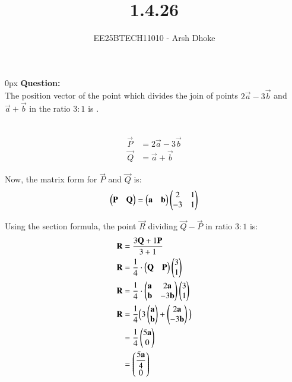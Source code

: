 \documentclass[journal]{IEEEtran}
\begin{document}

\vspace{3cm}

\title{1.4.26}
\author{EE25BTECH11010 - Arsh Dhoke}
{\let\newpage\relax\maketitle}

\renewcommand{\thefigure}{\theenumi}
\renewcommand{\thetable}{\theenumi}
\setlength{\intextsep}{10pt}
\renewcommand{\thetable}{\theenumi}

\parindent 0px
\textbf{Question:} \\
The position vector of the point which divides the join of points $2\vec{a} - 3\vec{b}$ and $\vec{a} + \vec{b}$ in the ratio $3:1$ is \underline{\hspace{2cm}}.

\solution \\

\begin{align}
    \vec{P} &= 2\vec{a}-3\vec{b}\\
    \vec{Q} &= \vec{a}+\vec{b}
\end{align}

Now, the matrix form for $\vec{P}$ and $\vec{Q}$ is:
\begin{align}
\begin{pmatrix}\mathbf{P} & \mathbf{Q}\end{pmatrix}
=\begin{pmatrix}\mathbf{a} & \mathbf{b}\end{pmatrix}
\begin{pmatrix}2 & 1 \\ -3 & 1\end{pmatrix}
\end{align}

Using the section formula, the point $\vec{R}$ dividing $\vec{Q} - \vec{P}$ in ratio $3:1$ is:
\begin{align}
\mathbf{R} &= \frac{3\mathbf{Q} + 1\mathbf{P}}{3+1} \\
\mathbf{R} &= \frac{1}{4} \cdot \begin{pmatrix}\mathbf{Q} & \mathbf{P}\end{pmatrix} \begin{pmatrix}3 \\ 1\end{pmatrix} \\
\mathbf{R} &=\frac{1}{4} \cdot \begin{pmatrix}\mathbf{a} &   2\mathbf{a} \\ \mathbf{b} & -3\mathbf{b}\end{pmatrix} \begin{pmatrix}3 \\ 1\end{pmatrix} \\
\mathbf{R} &= \frac{1}{4}\Big(3\begin{pmatrix}\mathbf{a} \\ \mathbf{b}\end{pmatrix} + \begin{pmatrix}2\mathbf{a} \\ -3\mathbf{b}\end{pmatrix}\Big) \\
&= \frac{1}{4}\begin{pmatrix}5\mathbf{a} \\ 0\end{pmatrix} \\
&= \begin{pmatrix}\dfrac{5\mathbf{a}}{4} \\ 0\end{pmatrix}
\end{align}
\end{document}
